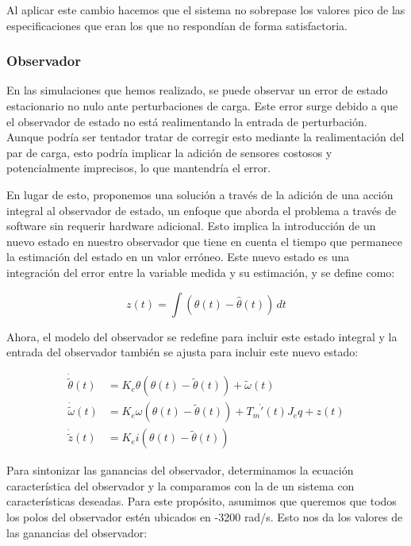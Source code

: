 \documentclass{article}
\begin{document}
Al aplicar este cambio hacemos que el sistema no sobrepase los valores pico de las especificaciones
que eran los que no respondían de forma satisfactoria.


\subsubsection{Observador}

En las simulaciones que hemos realizado, se puede observar un error de estado estacionario no nulo 
ante perturbaciones de carga. Este error surge debido a que el observador de estado no está 
realimentando la entrada de perturbación. Aunque podría ser tentador tratar de corregir esto 
mediante la realimentación del par de carga, esto podría implicar la adición de sensores costosos 
y potencialmente imprecisos, lo que mantendría el error.

En lugar de esto, proponemos una solución a través de la adición de una acción integral al 
observador de estado, un enfoque que aborda el problema a través de software sin requerir hardware 
adicional. Esto implica la introducción de un nuevo estado en nuestro observador que tiene en 
cuenta el tiempo que permanece la estimación del estado en un valor erróneo. Este nuevo estado es 
una integración del error entre la variable medida y su estimación, y se define como:

\begin{equation}
    z(t) = \int (\theta(t) - \hat{\theta}(t))\,dt
\end{equation}

Ahora, el modelo del observador se redefine para incluir este estado integral y la entrada del 
observador también se ajusta para incluir este nuevo estado:

\begin{align*}
    \dot{\tilde{\theta}}(t) &= K_e \theta \left(\theta(t) - \tilde{\theta}(t)\right) + \tilde{\omega}(t) \\
    \dot{\tilde{\omega}}(t) &= K_e \omega \left(\theta(t) - \tilde{\theta}(t)\right) + T_m \dot{'}(t) J_eq + z(t) \\
    \dot{\tilde{z}}(t) &= K_e i \left(\theta(t) - \tilde{\theta}(t)\right)
\end{align*}

Para sintonizar las ganancias del observador, determinamos la ecuación característica del 
observador y la comparamos con la de un sistema con características deseadas. Para este propósito, 
asumimos que queremos que todos los polos del observador estén ubicados en -3200 rad/s. Esto nos 
da los valores de las ganancias del observador:
\end{document}
